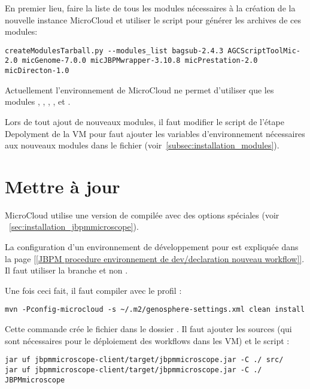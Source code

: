 En premier lieu, faire la liste de tous les modules nécessaires à la création de la nouvelle instance MicroCloud et utiliser
le script  pour générer les archives de ces modules:
\begin{lstlisting}[style=bash]
createModulesTarball.py --modules_list bagsub-2.4.3 AGCScriptToolMic-2.0 micGenome-7.0.0 micJBPMwrapper-3.10.8 micPrestation-2.0 micDirecton-1.0
\end{lstlisting}

Actuellement l'environnement de MicroCloud ne permet d'utiliser que les modules , , , ,  et .

\begin{warningbox}
    Lors de tout ajout de nouveaux modules, il faut modifier le script de l'étape Depolyment de la VM 
    pour faut ajouter les variables d'environnement nécessaires aux nouveaux modules
    dans le fichier  (voir~\autoref{subsec:installation_modules}).
\end{warningbox}

\section{Mettre à jour } \label{sec:nouvelle_version_jbpmmicroscope}

MicroCloud utilise une version de  compilée avec des options spéciales (voir ~\autoref{sec:installation_jbpmmicroscope}).

La configuration d'un environnement de développement pour  est expliquée
dans la page \href{https://intranet.genoscope.cns.fr/agc/redmine/projects/microscopeworkflow/wiki/JBPMprocedure}{[[JBPM procedure environnement de dev/declaration nouveau workflow]]}.
Il faut utiliser la branche  et non .

Une fois ceci fait, il faut compiler  avec le profil :
\begin{lstlisting}[style=bash]
mvn -Pconfig-microcloud -s ~/.m2/genosphere-settings.xml clean install
\end{lstlisting}
Cette commande crée le fichier  dans le dossier .
Il faut ajouter les sources (qui sont nécessaires pour le déploiement des workflows dans les VM) et le script :
\begin{lstlisting}[style=bash]
jar uf jbpmmicroscope-client/target/jbpmmicroscope.jar -C ./ src/
jar uf jbpmmicroscope-client/target/jbpmmicroscope.jar -C ./ JBPMmicroscope
\end{lstlisting}

